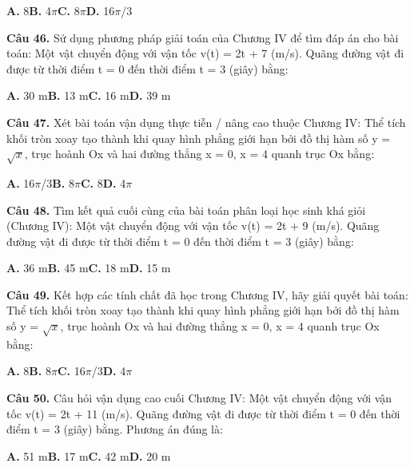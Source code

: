 \documentclass[11pt,a4paper]{article}
\begin{document}
\hspace*{1.5em}\textbf{A.} 8\quad\quad \textbf{B.} 4$\pi$\quad\quad \textbf{C.} 8$\pi$\quad\quad \textbf{D.} 16$\pi$/3\par\vspace{2pt}
\textbf{\color{primary} Câu 46.} Sử dụng phương pháp giải toán của Chương IV để tìm đáp án cho bài toán: Một vật chuyển động với vận tốc v(t) = 2t + 7 (m/s). Quãng đường vật đi được từ thời điểm t = 0 đến thời điểm t = 3 (giây) bằng:\par
\hspace*{1.5em}\textbf{A.} 30 m\quad\quad \textbf{B.} 13 m\quad\quad \textbf{C.} 16 m\quad\quad \textbf{D.} 39 m\par\vspace{2pt}
\textbf{\color{primary} Câu 47.} Xét bài toán vận dụng thực tiễn / nâng cao thuộc Chương IV: Thể tích khối tròn xoay tạo thành khi quay hình phẳng giới hạn bởi đồ thị hàm số y = $\sqrt{x}$, trục hoành Ox và hai đường thẳng x = 0, x = 4 quanh trục Ox bằng:\par
\hspace*{1.5em}\textbf{A.} 16$\pi$/3\quad\quad \textbf{B.} 8$\pi$\quad\quad \textbf{C.} 8\quad\quad \textbf{D.} 4$\pi$\par\vspace{2pt}
\textbf{\color{primary} Câu 48.} Tìm kết quả cuối cùng của bài toán phân loại học sinh khá giỏi (Chương IV): Một vật chuyển động với vận tốc v(t) = 2t + 9 (m/s). Quãng đường vật đi được từ thời điểm t = 0 đến thời điểm t = 3 (giây) bằng:\par
\hspace*{1.5em}\textbf{A.} 36 m\quad\quad \textbf{B.} 45 m\quad\quad \textbf{C.} 18 m\quad\quad \textbf{D.} 15 m\par\vspace{2pt}
\textbf{\color{primary} Câu 49.} Kết hợp các tính chất đã học trong Chương IV, hãy giải quyết bài toán: Thể tích khối tròn xoay tạo thành khi quay hình phẳng giới hạn bởi đồ thị hàm số y = $\sqrt{x}$, trục hoành Ox và hai đường thẳng x = 0, x = 4 quanh trục Ox bằng:\par
\hspace*{1.5em}\textbf{A.} 8\quad\quad \textbf{B.} 8$\pi$\quad\quad \textbf{C.} 16$\pi$/3\quad\quad \textbf{D.} 4$\pi$\par\vspace{2pt}
\textbf{\color{primary} Câu 50.} Câu hỏi vận dụng cao cuối Chương IV: Một vật chuyển động với vận tốc v(t) = 2t + 11 (m/s). Quãng đường vật đi được từ thời điểm t = 0 đến thời điểm t = 3 (giây) bằng. Phương án đúng là:\par
\hspace*{1.5em}\textbf{A.} 51 m\quad\quad \textbf{B.} 17 m\quad\quad \textbf{C.} 42 m\quad\quad \textbf{D.} 20 m\par\vspace{2pt}
\end{document}
